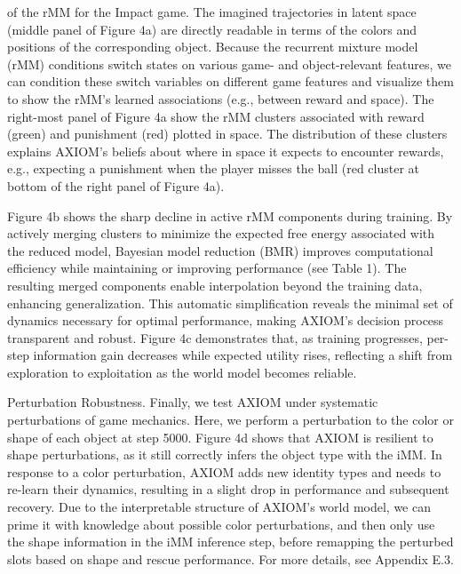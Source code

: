 \documentclass[10pt]{article}
\begin{document}
of the rMM for the Impact game. The imagined trajectories in latent space (middle panel of Figure 4a) are directly readable in terms of the colors and positions of the corresponding object. Because the recurrent mixture model (rMM) conditions switch states on various game- and object-relevant features, we can condition these switch variables on different game features and visualize them to show the rMM's learned associations (e.g., between reward and space). The right-most panel of Figure 4a show the rMM clusters associated with reward (green) and punishment (red) plotted in space. The distribution of these clusters explains AXIOM's beliefs about where in space it expects to encounter rewards, e.g., expecting a punishment when the player misses the ball (red cluster at bottom of the right panel of Figure 4a).

Figure 4b shows the sharp decline in active rMM components during training. By actively merging clusters to minimize the expected free energy associated with the reduced model, Bayesian model reduction (BMR) improves computational efficiency while maintaining or improving performance (see Table 1). The resulting merged components enable interpolation beyond the training data, enhancing generalization. This automatic simplification reveals the minimal set of dynamics necessary for optimal performance, making AXIOM's decision process transparent and robust. Figure 4c demonstrates that, as training progresses, per-step information gain decreases while expected utility rises, reflecting a shift from exploration to exploitation as the world model becomes reliable.

Perturbation Robustness. Finally, we test AXIOM under systematic perturbations of game mechanics. Here, we perform a perturbation to the color or shape of each object at step 5000. Figure 4d shows that AXIOM is resilient to shape perturbations, as it still correctly infers the object type with the iMM. In response to a color perturbation, AXIOM adds new identity types and needs to re-learn their dynamics, resulting in a slight drop in performance and subsequent recovery. Due to the interpretable structure of AXIOM's world model, we can prime it with knowledge about possible color perturbations, and then only use the shape information in the iMM inference step, before remapping the perturbed slots based on shape and rescue performance. For more details, see Appendix E.3.
\end{document}
